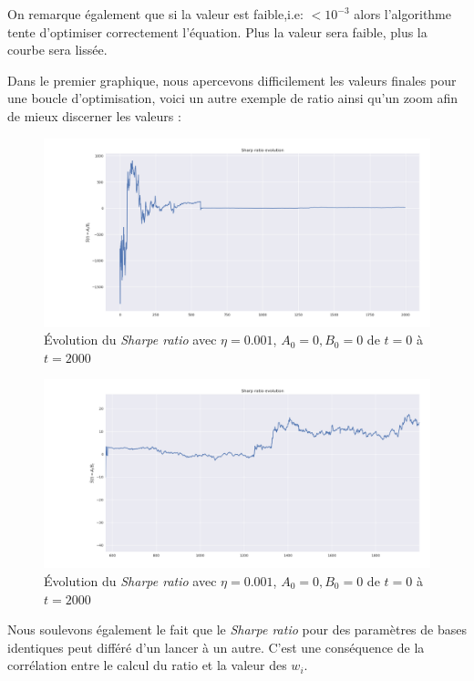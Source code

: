 \documentclass[a4paper, 11pt]{article}
\begin{document}
 On remarque également que si la valeur est faible,i.e: $< 10^{-3}$ alors l'algorithme tente d'optimiser correctement l'équation. Plus la valeur sera faible,
 plus la courbe sera lissée.

Dans le premier graphique, nous apercevons difficilement les valeurs finales pour une boucle d'optimisation, voici un autre exemple de ratio ainsi qu'un zoom afin de mieux discerner les valeurs :
\begin{figure}[H]
	\centering
	\includegraphics[scale=0.35]{images/res/Sharpe_ratio_evolution_big}
	\caption{Évolution du \textit{Sharpe ratio} avec $\eta = 0.001$, $A_0 = 0, B_0 = 0$ de $t=0$ à $t=2000$}
\end{figure} 

\begin{figure}[H]
	\centering
	\includegraphics[scale=0.35]{images/res/Sharpe_ratio_evolution_small}
	\caption{Évolution du \textit{Sharpe ratio} avec $\eta = 0.001$, $A_0 = 0, B_0 = 0$ de $t=0$ à $t=2000$}
\end{figure} 

Nous soulevons également le fait que le \textit{Sharpe ratio} pour des paramètres de bases identiques peut différé d'un lancer à un autre. C'est une conséquence de la corrélation entre le calcul du ratio et la valeur des $w_i$.
\end{document}
